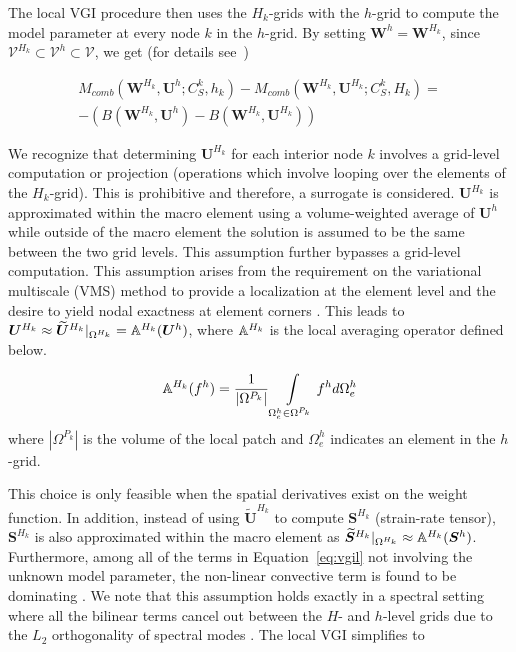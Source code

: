 The local VGI procedure then uses the
$H_k$-grids with the $h$-grid to compute the model
parameter at every node $k$ in the $h$-grid.
By setting $\bm{W}^h = \bm{W}^{H_k}$,
since $\bm{\mathcal{V}}^{H_k} \subset \bm{\mathcal{V}}^h \subset \bm{\mathcal{V}}$,
we get (for details see~\cite{bib:tran2017b})

\begin{equation}
\label{eq:vgil}
\begin{split}
 M_{comb}(\bm{W}^{H_k},\bm{U}^h; C^k_S, h_k) - M_{comb}(\bm{W}^{H_k},\bm{U}^{H_k}; C^k_S, {H_k})  = \\
  -(B(\bm{W}^{H_k},\bm{U}^h)- B(\bm{W}^{H_k},\bm{U}^{H_k}))
\end{split}
\end{equation}

We recognize that determining $\bm{U}^{H_k}$ for each interior node $k$ involves a grid-level
computation or projection (operations which involve looping over the elements of the $H_k$-grid). This is prohibitive and therefore, a surrogate is considered.
$\bm{U}^{H_k}$ is approximated within the macro element
using a volume-weighted average of $\bm{U}^h$ while outside
of the macro element the solution is assumed to be the same between the two grid levels.
This assumption further bypasses a grid-level computation. This assumption arises from the requirement on the variational multiscale (VMS) method to provide a localization at the element level and the desire to yield nodal exactness at element corners \cite{bib:hughes3}.
This leads to
$\bm{U}^{H_k} \approx \widetilde{\bm{U}}^{H_k}|_{\Omega^{H_k}} = \mathbb{A}^{H_k}(\bm{U}^h)$, where
$\mathbb{A}^{H_k}$ is the local averaging operator defined below.

\begin{equation}
\label{eq:avg}
\mathbb{A}^{H_k} (f^h) = \frac{1}{|\Omega^{P_k}|}\int\limits_{\Omega^h_e\in\Omega^{P_k}} f^h d\Omega^h_e
\end{equation}
\noindent where $|\Omega^{P_k}|$ is the volume of the local patch
and $\Omega^h_e$ indicates an element in the $h$-grid.

This choice is only feasible when the spatial derivatives exist on the weight function.
In addition, instead of using $\widetilde{\bm{U}}^{H_k}$ to compute $\bm{S}^{H_k}$ (strain-rate tensor), $\bm{S}^{H_k}$ is also approximated within the macro element as $\widetilde{\bm{S}}^{H_k}|_{\Omega^{H_k}} \approx \mathbb{A}^{H_k}(\bm{S}^h)$.
Furthermore, among all of the terms in Equation~\eqref{eq:vgil} 
not involving the unknown model parameter, the non-linear convective 
term is found to be dominating \cite{bib:tran2017b}. We note that this assumption holds 
exactly in a spectral setting where all the bilinear terms cancel out 
between the $H$- and $h$-level grids due to the $L_2$ orthogonality of 
spectral modes \cite{bib:oberai2005_2}. 
The local VGI simplifies to

